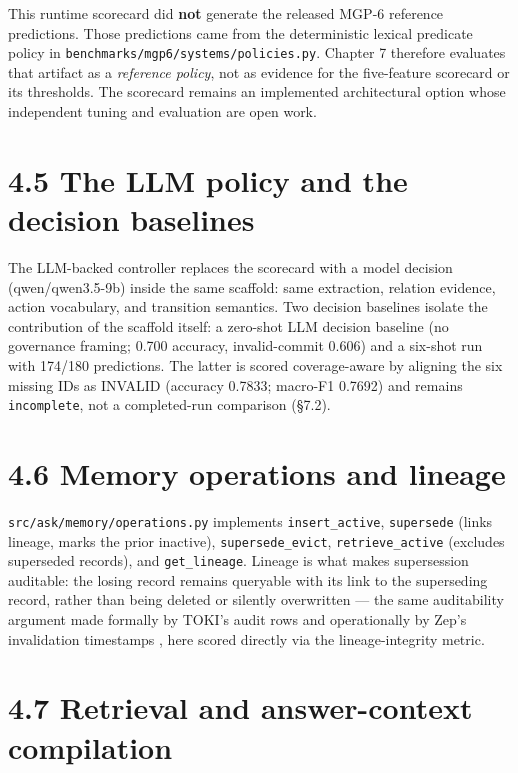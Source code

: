 This runtime scorecard did \textbf{not} generate the released MGP-6
reference predictions. Those predictions came from the deterministic
lexical predicate policy in
\texttt{benchmarks/mgp6/systems/policies.py}. Chapter 7 therefore
evaluates that artifact as a \emph{reference policy}, not as evidence
for the five-feature scorecard or its thresholds. The scorecard remains
an implemented architectural option whose independent tuning and
evaluation are open work.

\section{4.5 The LLM policy and the decision
baselines}\label{the-llm-policy-and-the-decision-baselines}

The LLM-backed controller replaces the scorecard with a model decision
(qwen/qwen3.5-9b) inside the same scaffold: same extraction, relation
evidence, action vocabulary, and transition semantics. Two decision
baselines isolate the contribution of the scaffold itself: a zero-shot
LLM decision baseline (no governance framing; 0.700 accuracy,
invalid-commit 0.606) and a six-shot run with 174/180 predictions. The
latter is scored coverage-aware by aligning the six missing IDs as
INVALID (accuracy 0.7833; macro-F1 0.7692) and remains
\texttt{incomplete}, not a completed-run comparison (§7.2).

\section{4.6 Memory operations and
lineage}\label{memory-operations-and-lineage}

\texttt{src/ask/memory/operations.py} implements
\texttt{insert\_active}, \texttt{supersede} (links lineage, marks the
prior inactive), \texttt{supersede\_evict}, \texttt{retrieve\_active}
(excludes superseded records), and \texttt{get\_lineage}. Lineage is
what makes supersession auditable: the losing record remains queryable
with its link to the superseding record, rather than being deleted or
silently overwritten --- the same auditability argument made formally by
TOKI's audit rows \citep{wang2026toki} and operationally by Zep's
invalidation timestamps \citep{rasmussen2025zep}, here scored directly
via the lineage-integrity metric.

\section{4.7 Retrieval and answer-context
compilation}\label{retrieval-and-answer-context-compilation}

